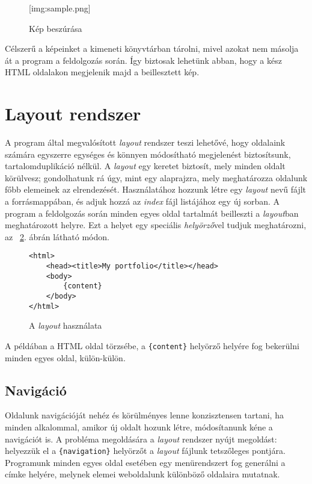 \documentclass[a4paper,10pt]{article}
\begin{document}
\begin{figure}[h]
	\begin{center}
		[img:sample.png]
		\caption{Kép beszúrása}
		\label{fig:insimg}
	\end{center}
\end{figure}

Célszerű a képeinket a kimeneti könyvtárban tárolni, mivel azokat nem másolja át a program a feldolgozás során. Így biztosak lehetünk abban, hogy a kész HTML oldalakon megjelenik majd a beillesztett kép.

\section{Layout rendszer}
\label{sec:layout}
A program által megvalósított \emph{layout} rendszer teszi lehetővé, hogy oldalaink számára egyszerre egységes és könnyen módosítható megjelenést biztosítsunk, tartalomduplikáció nélkül. A \emph{layout} egy keretet biztosít, mely minden oldalt körülvesz; gondolhatunk rá úgy, mint egy alaprajzra, mely meghatározza oldalunk főbb elemeinek az elrendezését. Használatához hozzunk létre egy \emph{layout} nevű fájlt a forrásmappában, és adjuk hozzá az \emph{index} fájl listájához egy új sorban.
A program a feldolgozás során minden egyes oldal tartalmát beilleszti a \emph{layout}ban meghatározott helyre. Ezt a helyet egy speciális \emph{helyörző}vel tudjuk meghatározni, az ~\ref{fig:layout}. ábrán látható módon.

\begin{figure}[h]
	\begin{center}
		\begin{lstlisting}
<html>
	<head><title>My portfolio</title></head>
	<body>
		{content}
	</body>
</html>
		\end{lstlisting}
		\caption{A \emph{layout} használata}
		\label{fig:layout}
	\end{center}
\end{figure}

A példában a HTML oldal törzsébe, a \texttt{\{content\}} helyörző helyére fog bekerülni minden egyes oldal, külön-külön.

\subsection{Navigáció}
Oldalunk navigációját nehéz és körülményes lenne konzisztensen tartani, ha minden alkalommal, amikor új oldalt hozunk létre, módosítanunk kéne a navigációt is. A probléma megoldására a \emph{layout} rendszer nyújt megoldást: helyezzük el a \texttt{\{navigation\}} helyörzőt a \emph{layout} fájlunk tetszőleges pontjára. Programunk minden egyes oldal esetében egy menürendszert fog generálni a címke helyére, melynek elemei weboldalunk különböző oldalaira mutatnak.
\end{document}

